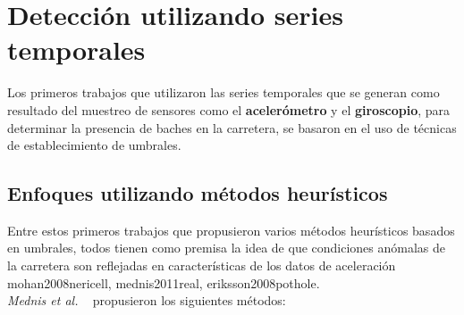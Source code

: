 





\section{Detección utilizando series temporales}
	Los primeros trabajos que utilizaron las series temporales que se generan como resultado del muestreo de sensores como el \textbf
	{acelerómetro} y el \textbf{giroscopio}, para determinar la presencia de baches en la carretera, se basaron en el uso de técnicas
	de establecimiento de umbrales.\\

	\subsection{Enfoques utilizando métodos heurísticos}
		Entre estos primeros trabajos que propusieron varios métodos heurísticos basados en umbrales, todos tienen como premisa
		la idea de que condiciones anómalas de la carretera son reflejadas en características de los datos de aceleración \brackcite
		{mohan2008nericell, mednis2011real, eriksson2008pothole}.\\

		\emph{Mednis et al.} ~ propusieron los siguientes métodos:\\

